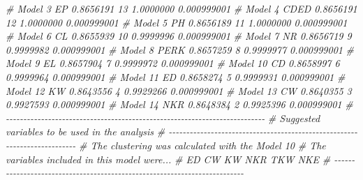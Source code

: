 \documentclass[
]{book}
\newenvironment{Shaded}{\begin{snugshade}}{\end{snugshade}}
\newcommand{\CommentTok}[1]{\textcolor[rgb]{0.56,0.35,0.01}{\textit{#1}}}
\numberwithin{equation}{section}
\begin{document}
\begin{Shaded}
\begin{Highlighting}[]
\CommentTok{\#   Model 3       EP  0.8656191        13 1.0000000 0.000999001}
\CommentTok{\#   Model 4     CDED  0.8656191        12 1.0000000 0.000999001}
\CommentTok{\#   Model 5       PH  0.8656189        11 1.0000000 0.000999001}
\CommentTok{\#   Model 6       CL  0.8655939        10 0.9999996 0.000999001}
\CommentTok{\#   Model 7       NR  0.8656719         9 0.9999982 0.000999001}
\CommentTok{\#   Model 8     PERK  0.8657259         8 0.9999977 0.000999001}
\CommentTok{\#   Model 9       EL  0.8657904         7 0.9999972 0.000999001}
\CommentTok{\#  Model 10       CD  0.8658997         6 0.9999964 0.000999001}
\CommentTok{\#  Model 11       ED  0.8658274         5 0.9999931 0.000999001}
\CommentTok{\#  Model 12       KW  0.8643556         4 0.9929266 0.000999001}
\CommentTok{\#  Model 13       CW  0.8640355         3 0.9927593 0.000999001}
\CommentTok{\#  Model 14      NKR  0.8648384         2 0.9925396 0.000999001}
\CommentTok{\# {-}{-}{-}{-}{-}{-}{-}{-}{-}{-}{-}{-}{-}{-}{-}{-}{-}{-}{-}{-}{-}{-}{-}{-}{-}{-}{-}{-}{-}{-}{-}{-}{-}{-}{-}{-}{-}{-}{-}{-}{-}{-}{-}{-}{-}{-}{-}{-}{-}{-}{-}{-}{-}{-}{-}{-}{-}{-}{-}{-}{-}{-}{-}{-}{-}{-}{-}{-}{-}{-}{-}{-}{-}{-}}
\CommentTok{\# Suggested variables to be used in the analysis }
\CommentTok{\# {-}{-}{-}{-}{-}{-}{-}{-}{-}{-}{-}{-}{-}{-}{-}{-}{-}{-}{-}{-}{-}{-}{-}{-}{-}{-}{-}{-}{-}{-}{-}{-}{-}{-}{-}{-}{-}{-}{-}{-}{-}{-}{-}{-}{-}{-}{-}{-}{-}{-}{-}{-}{-}{-}{-}{-}{-}{-}{-}{-}{-}{-}{-}{-}{-}{-}{-}{-}{-}{-}{-}{-}{-}{-} }
\CommentTok{\# The clustering was calculated with the  Model 10 }
\CommentTok{\# The variables included in this model were...}
\CommentTok{\#  ED CW KW NKR TKW NKE }
\CommentTok{\# {-}{-}{-}{-}{-}{-}{-}{-}{-}{-}{-}{-}{-}{-}{-}{-}{-}{-}{-}{-}{-}{-}{-}{-}{-}{-}{-}{-}{-}{-}{-}{-}{-}{-}{-}{-}{-}{-}{-}{-}{-}{-}{-}{-}{-}{-}{-}{-}{-}{-}{-}{-}{-}{-}{-}{-}{-}{-}{-}{-}{-}{-}{-}{-}{-}{-}{-}{-}{-}{-}{-}{-}{-}{-}}
\end{Highlighting}
\end{Shaded}
\end{document}
